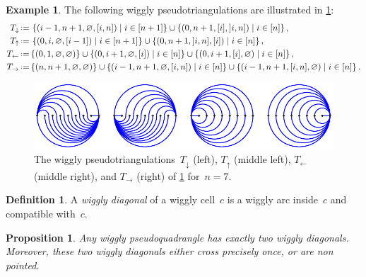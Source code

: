 \documentclass{amsart}
\newtheorem{proposition}[theorem]{Proposition}
\theoremstyle{definition}
\newtheorem{definition}[theorem]{Definition}
\newtheorem{example}[theorem]{Example}
\newcommand{\set}[2]{\left\{ #1 \;\middle|\; #2 \right\}} %
\newcommand{\eqdef}{\mbox{\,\raisebox{0.2ex}{\scriptsize\ensuremath{\mathrm:}}\ensuremath{=}\,}} %
\newcommand{\darkblue}{\color{darkblue}} %
\newcommand{\defn}[1]{\textsl{\darkblue #1}} %
\begin{document}
\begin{example}
\label{exm:specialWigglyPseudotriangulations}
The following wiggly pseudotriangulations are illustrated in \cref{fig:specialWigglyPseudotriangulations}:
\begin{align*}
T_\downarrow & \eqdef \set{(i-1, n+1, \varnothing, {[i,n]})}{i \in [n+1]} \cup \set{(0, n+1, [i], {]i,n]})}{i \in [n]}, \\
T_\uparrow & \eqdef \set{(0, i, \varnothing, {[i-1]})}{i \in [n+1]} \cup \set{(0, n+1, {]i,n]}, [i])}{i \in [n]}, \\
T_\leftarrow & \eqdef \{(0, 1, \varnothing, \varnothing)\} \cup \set{(0, i+1, \varnothing, [i])}{i \in [n]} \cup \set{(0, i+1, [i], \varnothing)}{i \in [n]}, \\
T_\rightarrow & \eqdef \{(n, n+1, \varnothing, \varnothing)\} \cup \set{(i-1, n+1, \varnothing, [i,n])}{i \in [n]} \cup \set{(i-1, n+1, [i,n], \varnothing)}{i \in [n]}.
\end{align*}
%
\begin{figure}[h]
\centerline{\includegraphics[scale=1.3]{specialWigglyPseudotriangulations}}
\caption{The wiggly pseudotriangulations~$T_\downarrow$ (left), $T_\uparrow$ (middle left), $T_\leftarrow$ (middle right), and $T_\rightarrow$ (right) of \cref{exm:specialWigglyPseudotriangulations} for~$n = 7$.}
\label{fig:specialWigglyPseudotriangulations}
\end{figure}
\end{example}

\begin{definition}
A \defn{wiggly diagonal} of a wiggly cell~$c$ is a wiggly arc inside~$c$ and compatible with~$c$.
\end{definition}

\begin{proposition}
\label{prop:diagonalsPseudoquadrangle}
Any wiggly pseudoquadrangle has exactly two wiggly diagonals.
Moreover, these two wiggly diagonals either cross precisely once, or are non pointed.
\end{proposition}
\end{document}

